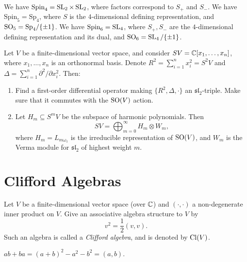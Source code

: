 \begin{example}
  We have $\mathrm{Spin}_4 = \operatorname{SL}_2 \times \operatorname{SL}_2$,
  where factors correspond to
  $S_+$ and $S_-$. We have
  $\mathrm{Spin}_5 = \mathrm{Sp}_4$,
  where $S$ is the $4$-dimensional
  defining representation, and
  $\operatorname{SO}_5 = \mathrm{Sp}_4 / \{\pm 1\}$.
  We have $\mathrm{Spin}_6 = \operatorname{SL}_4$,
  where $S_+, S_-$ are the
  $4$-dimensional defining
  representation and its dual, and
  $\operatorname{SO}_6 = \operatorname{SL}_4 / \{\pm 1\}$.
\end{example}

\begin{example}
  Let $V$ be a finite-dimensional
  vector space, and consider
  $S V = \mathbb{C}[x_1, \dots, x_n]$, where
  $x_1, \dots, x_n$ is an orthonormal
  basis.
  Denote $R^2 = \sum_{i = 1}^n x_i^2 = S^2 V$
  and $\Delta = \sum_{i = 1}^n \partial^2 / \partial x_i^2$.
  Then:
  \begin{enumerate}
    \item Find a first-order
      differential operator making
      $\{R^2, \Delta, \cdot\}$
      an $\mathfrak{sl}_2$-triple.
      Make sure that it commutes
      with the $\operatorname{SO}(V)$ action.
    \item Let $H_m \subseteq S^m V$
      be the subspace of harmonic
      polynomials. Then
      \[
        SV = \bigoplus_{m = 0}^\infty H_m \otimes W_m,
      \]
      where $H_m = L_{m \omega_1}$ is
      the irreducible representation
      of $\operatorname{SO}(V)$, and
      $W_m$ is the Verma module for
      $\mathfrak{sl}_2$ of highest
      weight $m$.
  \end{enumerate}
\end{example}

\section{Clifford Algebras}

\begin{definition}
  Let $V$ be a finite-dimensional
  vector space (over $\mathbb{C}$)
  and $(\cdot, \cdot)$ a non-degenerate
  inner product on $V$. Give an
  associative algebra structure
  to $V$ by
  \[
    v^2 = \frac{1}{2}(v, v).
  \]
  Such an algebra is called a
  \emph{Clifford algebra}, and is
  denoted by $\operatorname{Cl}(V)$.
\end{definition}

\begin{corollary}
  $ab + ba = (a + b)^2 - a^2 - b^2 = (a, b)$.
\end{corollary}

